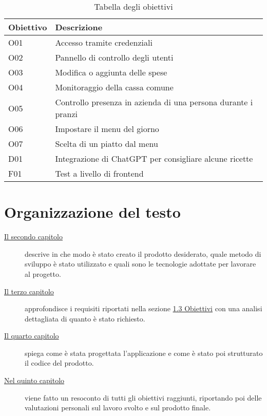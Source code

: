 \begin{table}[htb]%
    \caption{Tabella degli obiettivi}
    \label{tab:obiettivi-richiesti}
    \begin{tabularx}{\textwidth}{lX}
    \hline
    \textbf{Obiettivo} & \textbf{Descrizione} \\
    \hline\hline
    O01     & Accesso tramite credenziali \\
    \hline
    O02     & Pannello di controllo degli utenti \\
    \hline
    O03     & Modifica o aggiunta delle spese \\
    \hline
    O04     & Monitoraggio della cassa comune \\
    \hline
    O05     & Controllo presenza in azienda di una persona durante i pranzi \\
    \hline
    O06     & Impostare il menu del giorno \\
    \hline
    O07     & Scelta di un piatto dal menu \\
    \hline
    D01     & Integrazione di ChatGPT per consigliare alcune ricette \\
    \hline
    F01     & Test a livello di frontend \\
    \hline
    \end{tabularx}
\end{table}%

\newpage

\section{Organizzazione del testo}

\begin{description}
    \item[{\hyperref[cap:processi-metodologie]{Il secondo capitolo}}] descrive in che modo è stato creato il prodotto desiderato, quale metodo di sviluppo è stato utilizzato e quali sono le tecnologie adottate per lavorare al progetto.
    
    
    \item[{\hyperref[cap:analisi-requisiti]{Il terzo capitolo}}] approfondisce i requisiti riportati nella sezione \hyperref[sec:obbiettivi]{1.3 Obiettivi} con una analisi dettagliata di quanto è stato richiesto.
    
    \item[{\hyperref[cap:progettazione-codifica]{Il quarto capitolo}}] spiega come è stata progettata l'applicazione e come è stato poi strutturato il codice del prodotto.
    
    
    \item[{\hyperref[cap:conclusioni]{Nel quinto capitolo}}] viene fatto un resoconto di tutti gli obiettivi raggiunti, riportando poi delle valutazioni personali sul lavoro svolto e sul prodotto finale.
\end{description}


